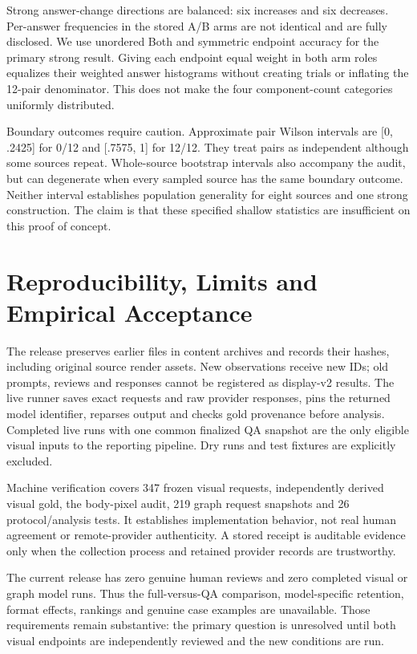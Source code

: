 \documentclass[10pt,twocolumn,letterpaper]{article}
\begin{document}
Strong answer-change directions are balanced: six increases and six
decreases. Per-answer frequencies in the stored A/B arms are not
identical and are fully disclosed. We use unordered Both and symmetric
endpoint accuracy for the primary strong result. Giving each endpoint
equal weight in both arm roles equalizes their weighted answer
histograms without creating trials or inflating the 12-pair denominator.
This does not make the four component-count categories uniformly
distributed.

Boundary outcomes require caution. Approximate pair Wilson intervals
are [0, .2425] for 0/12 and [.7575, 1] for 12/12.
They treat pairs as independent although some sources repeat.
Whole-source bootstrap intervals also accompany the audit, but
can degenerate when every sampled source has the same boundary
outcome. Neither interval establishes population generality for eight
sources and one strong construction. The claim is that these
specified shallow statistics are insufficient on this proof of concept.

\section{Reproducibility, Limits and Empirical Acceptance}
The release preserves earlier files in content archives and records
their hashes, including original source render assets. New observations
receive new IDs; old prompts, reviews and responses cannot be
registered as display-v2 results. The live runner saves exact requests
and raw provider responses, pins the returned model identifier,
reparses output and checks gold provenance before analysis. Completed
live runs with one common finalized QA snapshot are the only eligible
visual inputs to the reporting pipeline. Dry runs and test fixtures
are explicitly excluded.

Machine verification covers 347 frozen visual requests, independently
derived visual gold, the body-pixel audit, 219 graph request snapshots
and 26 protocol/analysis tests. It establishes implementation behavior,
not real human agreement or remote-provider authenticity. A stored
receipt is auditable evidence only when the collection process and
retained provider records are trustworthy.

The current release has zero genuine human reviews and zero completed
visual or graph model runs. Thus the full-versus-QA comparison,
model-specific retention, format effects, rankings and genuine case
examples are unavailable. Those requirements remain substantive:
the primary question is unresolved until both visual endpoints are
independently reviewed and the new conditions are run.
\end{document}
